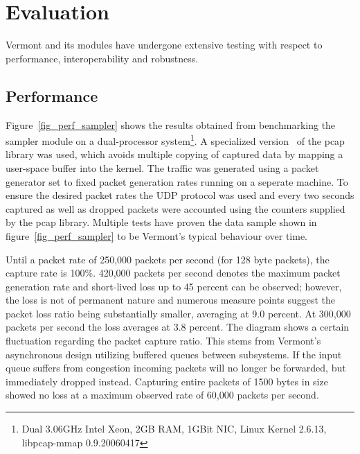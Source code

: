\section{Evaluation}
\label{sec:evaluation}

Vermont and its modules have undergone extensive testing with respect to performance, interoperability and robustness.

\subsection{Performance}

Figure~\ref{fig_perf_sampler} shows the results obtained from benchmarking the sampler module on a dual-processor system\footnote{Dual 3.06GHz Intel Xeon, 2GB RAM, 1GBit NIC, Linux Kernel 2.6.13, libpcap-mmap 0.9.20060417}.
A specialized version~\cite{pcap-mmap} of the pcap library was used, which avoids multiple copying of captured data by mapping a user-space buffer into the kernel.
The traffic was generated using a packet generator set to fixed packet generation rates running on a seperate machine. To ensure the desired packet rates the UDP protocol was used 
and every two seconds captured as well as dropped packets were accounted using the counters supplied by the pcap library. Multiple tests have proven the data sample shown in figure~\ref{fig_perf_sampler} to be Vermont's typical behaviour over time.

Until a packet rate of 250,000 packets per second (for 128 byte packets), the capture rate is 100\%.
420,000 packets per second denotes the maximum packet generation rate and short-lived loss up to 45 percent can be observed; however, the loss is not of permanent nature and numerous measure points suggest the packet loss ratio being substantially smaller, averaging at 9.0 percent. At 300,000 packets per second the loss averages at 3.8 percent.
The diagram shows a certain fluctuation regarding the packet capture ratio. This stems from Vermont's asynchronous design utilizing buffered queues between subsystems. If the input queue suffers from congestion incoming packets will no longer be forwarded, but immediately dropped instead.
Capturing entire packets of 1500 bytes in size showed no loss at a maximum observed rate of 60,000 packets per second.

